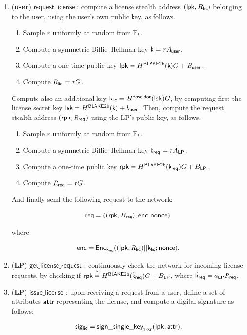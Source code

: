 \begin{enumerate}
	\item (\textbf{user}) $\mathsf{request\_license}$ : compute a license stealth address $(\mathsf{lpk}, R_{\mathsf{lic}})$ belonging to the user, using the user's own public key, as follows.

	\begin{enumerate}
		\item Sample $r$ uniformly at random from $\mathbb{F}_t$.
		\item Compute a symmetric Diffie--Hellman key $\mathsf{k} = rA_{\mathsf{user}}$.
		\item Compute a one-time public key $\mathsf{lpk} = H^\mathsf{BLAKE2b}(\mathsf{k})G + B_{\mathsf{user}}$.
		\item Compute $R_{\mathsf{lic}} = rG$.
	\end{enumerate}

	Compute also an additional key $\mathsf{k_{lic}} = H^\mathsf{Poseidon}(\mathsf{lsk})G$, by computing first the license secret key $\mathsf{lsk} = H^\mathsf{BLAKE2b}(\mathsf{k}) + b_{\mathsf{user}}$. Then, compute the request stealth address $(\mathsf{rpk}, R_{\mathsf{req}})$ using the LP's public key, as follows.

	\begin{enumerate}
		\item Sample $r$ uniformly at random from $\mathbb{F}_t$.
		\item Compute a symmetric Diffie--Hellman key $\mathsf{k_{req}} = rA_{\mathsf{LP}}$.
		\item Compute a one-time public key $\mathsf{rpk} = H^\mathsf{BLAKE2b}(\mathsf{k_{req}})G + B_{\mathsf{LP}}$.
		\item Compute $R_{\mathsf{req}} = rG$.
	\end{enumerate}

	And finally send the following request to the network:

		$$\mathsf{req} = ((\mathsf{rpk}, R_{\mathsf{req}}), \mathsf{enc}, \mathsf{nonce}),$$

	where 

		$$\mathsf{enc} = \mathsf{Enc}_{\mathsf{k_{req}}} ((\mathsf{lpk}, R_{\mathsf{lic}})||\mathsf{k_{lic}}; \mathsf{nonce}).$$


	\item (\textbf{LP}) $\mathsf{get\_license\_request}$ : continuously check the network for incoming license requests, by checking if $\mathsf{rpk} \stackrel{?}{=} H^\mathsf{BLAKE2b}(\mathsf{\tilde{k}_{req}}) G + B_{\mathsf{LP}}$, where $\mathsf{\tilde{k}_{req}} = a_{\mathsf{LP}}R_{\mathsf{req}}$.

	\item (\textbf{LP}) $\mathsf{issue\_license}$ : upon receiving a request from a user, define a set of attributes $\mathsf{attr}$ representing the license, and compute a digital signature as follows:

		$$\mathsf{sig_{lic}} = \mathsf{sign\_single\_key}_{\mathsf{sk}_{\mathsf{SP}}}(\mathsf{lpk}, \mathsf{attr}).$$


\end{enumerate}
